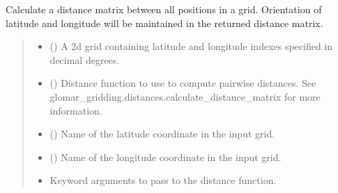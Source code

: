 \documentclass[letterpaper,10pt,english]{sphinxmanual}
\begin{document}
\begin{fulllineitems}
\label{\detokenize{covariance:glomar_gridding.grid.grid_to_distance_matrix}}
\pysigstartsignatures
\pysiglinewithargsret
{}
{\sphinxparamcomma {}\sphinxparamcomma {}\sphinxparamcomma {}\sphinxparamcomma {}}
{}
\pysigstopsignatures
\sphinxAtStartPar
Calculate a distance matrix between all positions in a grid. Orientation of
latitude and longitude will be maintained in the returned distance matrix.
\begin{quote}\begin{description}
\begin{itemize}
\item {}
\sphinxAtStartPar
{} () \textendash{} A 2\sphinxhyphen{}d grid containing latitude and longitude indexes specified in
decimal degrees.

\item {}
\sphinxAtStartPar
{} () \textendash{} Distance function to use to compute pairwise distances. See
glomar\_gridding.distances.calculate\_distance\_matrix for more
information.

\item {}
\sphinxAtStartPar
{} () \textendash{} Name of the latitude coordinate in the input grid.

\item {}
\sphinxAtStartPar
{} () \textendash{} Name of the longitude coordinate in the input grid.

\item {}
\sphinxAtStartPar
{} \textendash{} Keyword arguments to pass to the distance function.

\end{itemize}


\end{description}
\end{quote}
\end{fulllineitems}
\end{document}
